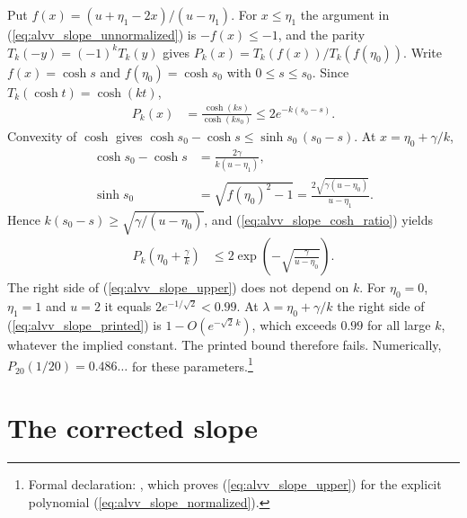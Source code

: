 \documentclass{article}
\begin{document}
Put $f(x)=(u+\eta_1-2x)/(u-\eta_1)$. For $x\le\eta_1$ the argument in
(\ref{eq:alvv_slope_unnormalized}) is $-f(x)\le-1$, and the parity
$T_k(-y)=(-1)^kT_k(y)$ gives $P_k(x)=T_k(f(x))/T_k(f(\eta_0))$.
Write $f(x)=\cosh s$ and $f(\eta_0)=\cosh s_0$ with $0\le s\le s_0$.
Since $T_k(\cosh t)=\cosh(kt)$,
\begin{align}
    P_k(x) & =\frac{\cosh(ks)}{\cosh(ks_0)}\le2e^{-k(s_0-s)}.
    \label{eq:alvv_slope_cosh_ratio}
\end{align}
Convexity of $\cosh$ gives $\cosh s_0-\cosh s\le\sinh s_0\,(s_0-s)$. At
$x=\eta_0+\gamma/k$,
\begin{align}
    \cosh s_0-\cosh s & =\frac{2\gamma}{k(u-\eta_1)},
    \label{eq:alvv_slope_gap}\\
    \sinh s_0         & =\sqrt{f(\eta_0)^2-1}
    =\frac{2\sqrt{\gamma(u-\eta_0)}}{u-\eta_1}.
    \label{eq:alvv_slope_sinh}
\end{align}
Hence $k(s_0-s)\ge\sqrt{\gamma/(u-\eta_0)}$, and
(\ref{eq:alvv_slope_cosh_ratio}) yields
\begin{align}
    P_k\left(\eta_0+\frac\gamma k\right)
     & \le2\exp\left(-\sqrt{\frac{\gamma}{u-\eta_0}}\right).
    \label{eq:alvv_slope_upper}
\end{align}
The right side of (\ref{eq:alvv_slope_upper}) does not depend on $k$.
For $\eta_0=0$, $\eta_1=1$ and $u=2$ it equals $2e^{-1/\sqrt2}<0.99$. At
$\lambda=\eta_0+\gamma/k$ the right side of (\ref{eq:alvv_slope_printed}) is
$1-O(e^{-\sqrt2\,k})$, which exceeds $0.99$ for all large $k$, whatever the
implied constant. The printed bound therefore fails. Numerically,
$P_{20}(1/20)=0.486\ldots$ for these parameters.\footnote{Formal declaration:
    , which
    proves (\ref{eq:alvv_slope_upper}) for the explicit polynomial
    (\ref{eq:alvv_slope_normalized}).}

\section{The corrected slope}
\end{document}
